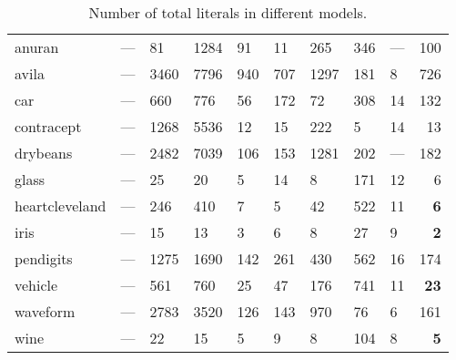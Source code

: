 \begin{table}[ht]
\begin{tabular}{lllllllll|r}
  anuran & --- & 81 & 1284 & 91 & 11 & 265 & 346 & --- & 100 \\ 
  avila & --- & 3460 & 7796 & 940 & 707 & \scriptsize{1297} & \scriptsize{181} & \scriptsize{8} & 726 \\ 
  car & --- & 660 & 776 & 56 & 172 & \scriptsize{72} & 308 & \scriptsize{14} & 132 \\ 
  contracept & --- & 1268 & \scriptsize{5536} & 12 & \scriptsize{15} & \scriptsize{222} & \scriptsize{5} & \scriptsize{14} & 13 \\ 
  drybeans & --- & 2482 & 7039 & 106 & 153 & \scriptsize{1281} & 202 & --- & 182 \\ 
  glass & --- & 25 & 20 & 5 & 14 & 8 & 171 & \scriptsize{12} & 6 \\ 
  heartcleveland & --- & \scriptsize{246} & \scriptsize{410} & 7 & \scriptsize{5} & 42 & \scriptsize{522} & \scriptsize{11} & \textbf{6} \\ 
  iris & --- & 15 & 13 & 3 & 6 & 8 & 27 & \scriptsize{9} & \textbf{2} \\ 
  pendigits & --- & 1275 & 1690 & 142 & 261 & 430 & 562 & \scriptsize{16} & 174 \\ 
  vehicle & --- & 561 & \scriptsize{760} & 25 & 47 & 176 & \scriptsize{741} & \scriptsize{11} & \textbf{23} \\ 
  waveform & --- & \scriptsize{2783} & \scriptsize{3520} & 126 & 143 & \scriptsize{970} & \scriptsize{76} & \scriptsize{6} & 161 \\ 
  wine & --- & 22 & 15 & 5 & 9 & 8 & 104 & \scriptsize{8} & \textbf{5} \\ 
   \hline
\end{tabular}
\caption{Number of total literals in different models.}
\end{table}
